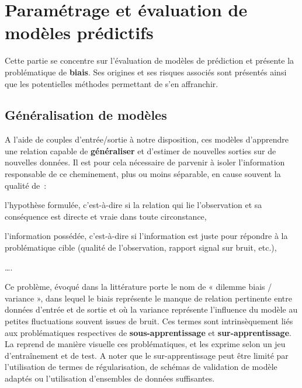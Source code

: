 \clearpage

\section{Paramétrage et évaluation de modèles prédictifs}
\label{sec:models_settings}
Cette partie se concentre sur l'évaluation de modèles de prédiction et présente la problématique de \textbf{biais}. Ses origines et ses risques associés sont présentés ainsi que les potentielles méthodes permettant de s'en affranchir.\par

\subsection{Généralisation de modèles}
\label{subsec:generalized_models}
A l'aide de couples d'entrée/sortie à notre disposition, ces modèles d’apprendre une relation capable de \textbf{généraliser} et d’estimer de nouvelles sorties sur de nouvelles données. Il est pour cela nécessaire de parvenir à isoler l'information responsable de ce cheminement, plus ou moins séparable, en cause souvent la qualité de~:
\begin{inlinerate}
    \item l'hypothèse formulée, c’est-à-dire si la relation qui lie l'observation et sa conséquence est directe et vraie dans toute circonstance,
    \item l'information possédée, c’est-à-dire si l'information est juste pour répondre à la problématique cible (qualité de l'observation, rapport signal sur bruit, etc.),
    \item \ldots.
\end{inlinerate}\par 

Ce problème, évoqué dans la littérature porte le nom de « dilemme biais / variance », dans lequel le biais représente le manque de relation pertinente entre données d’entrée et de sortie et où la variance représente l’influence du modèle au petites fluctuations souvent issues de bruit. Ces termes sont intrinsèquement liés aux problématiques respectives de \textbf{sous-apprentissage} et \textbf{sur-apprentissage}. La  reprend de manière visuelle ces problématiques, et les exprime selon un jeu d’entraînement et de test. A noter que le sur-apprentissage peut être limité par l’utilisation de termes de régularisation, de schémas de validation de modèle adaptés ou l’utilisation d’ensembles de données suffisantes.\par
 
